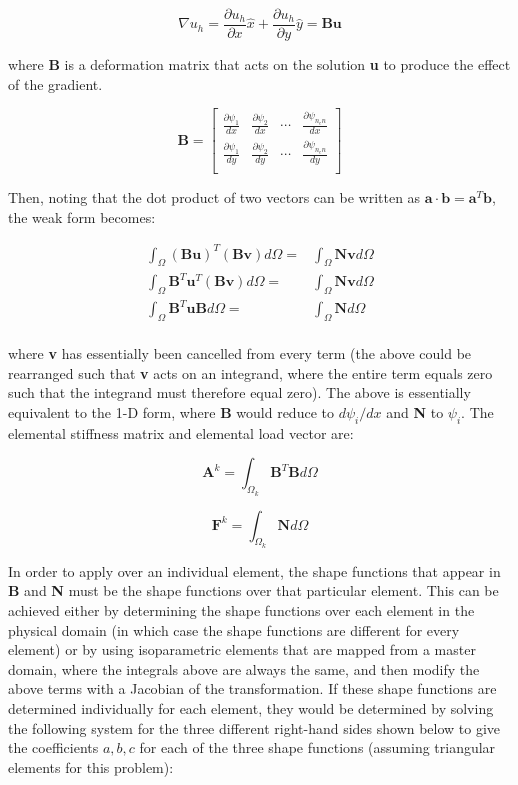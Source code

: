 \documentclass[10pt]{article}
\newcommand{\beq}{\begin{equation}}
\newcommand{\eeq}{\end{equation}}
\newcommand{\beqa}{\begin{equation}\begin{aligned}}
\newcommand{\eeqa}{\end{aligned}\end{equation}}
\begin{document}
\beq
\nabla u_h=\frac{\partial u_h}{\partial x}\hat{x}+\frac{\partial u_h}{\partial y}\hat{y}=\textbf{B}\textbf{u}
\eeq

where \textbf{B} is a deformation matrix that acts on the solution \textbf{u} to produce the effect of the gradient. 

\beq
\textbf{B}=\begin{bmatrix}
\frac{\partial\psi_1}{dx} & \frac{\partial\psi_2}{dx} & \cdots & \frac{\partial\psi_{n_en}}{dx}\\
\frac{\partial\psi_1}{dy} & \frac{\partial\psi_2}{dy} & \cdots & \frac{\partial\psi_{n_en}}{dy}\\
\end{bmatrix}
\eeq

Then, noting that the dot product of two vectors can be written as \(\textbf{a}\cdot\textbf{b}=\textbf{a}^T\textbf{b}\), the weak form becomes:

\beqa
\int_\Omega (\textbf{B}\textbf{u})^T(\textbf{B}\textbf{v})d\Omega=&\int_\Omega \textbf{N}\textbf{v}d\Omega\\
\int_\Omega \textbf{B}^T\textbf{u}^T(\textbf{B}\textbf{v})d\Omega=&\int_\Omega \textbf{N}\textbf{v}d\Omega\\
\int_\Omega \textbf{B}^T\textbf{u}\textbf{B}d\Omega=&\int_\Omega \textbf{N}d\Omega\\
\eeqa

where \textbf{v} has essentially been cancelled from every term (the above could be rearranged such that \textbf{v} acts on an integrand, where the entire term equals zero such that the integrand must therefore equal zero). The above is essentially equivalent to the 1-D form, where \textbf{B} would reduce to \(d\psi_i/dx\) and \textbf{N} to \(\psi_i\). The elemental stiffness matrix and elemental load vector are:

\beq
\label{eq:20}
\textbf{A}^k=\int_{\Omega_k} \textbf{B}^T\textbf{B}d\Omega
\eeq

\beq
\label{eq:21}
\textbf{F}^k=\int_{\Omega_k} \textbf{N}d\Omega
\eeq

In order to apply over an individual element, the shape functions that appear in \textbf{B} and \textbf{N} must be the shape functions over that particular element. This can be achieved either by determining the shape functions over each element in the physical domain (in which case the shape functions are different for every element) or by using isoparametric elements that are mapped from a master domain, where the integrals above are always the same, and then modify the above terms with a Jacobian of the transformation. If these shape functions are determined individually for each element, they would be determined by solving the following system for the three different right-hand sides shown below to give the coefficients \(a, b, c\) for each of the three shape functions (assuming triangular elements for this problem):
\end{document}
